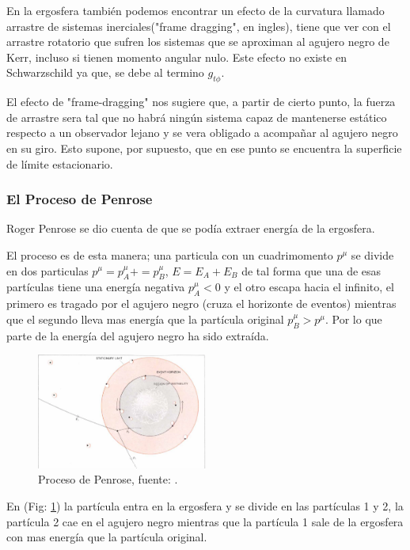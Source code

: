 \documentclass{article}
\begin{document}
En la ergosfera también podemos encontrar un efecto de la curvatura llamado arrastre de sistemas inerciales("frame dragging", en ingles), tiene que ver con el arrastre rotatorio que sufren los sistemas que se aproximan al agujero negro de Kerr, incluso si tienen momento angular nulo. Este efecto no existe en Schwarzschild ya que, se debe al termino $g_{t\phi}$.\cite{jeffersonagujeros}

El efecto de "frame-dragging" nos sugiere que, a partir de cierto punto, la fuerza de arrastre sera tal que no habrá ningún sistema capaz de mantenerse estático respecto a un observador lejano y se vera obligado a acompañar al agujero negro en su giro. Esto supone, por supuesto, que en ese punto se encuentra la superficie de límite estacionario.\cite{jeffersonagujeros}

\subsubsection{El Proceso de Penrose}
Roger Penrose se dio cuenta de que se podía extraer energía de la ergosfera.

El proceso es de esta manera; una particula con un cuadrimomento $p^{\mu}$ se divide en dos particulas $p^{\mu}=p^{\mu}_{A}+=p^{\mu}_{B}$, $E=E_{A}+E_{B}$ de tal forma que una de esas partículas tiene una energía negativa $p^{\mu}_{A} < 0$ y el otro escapa hacia el infinito, el primero es tragado por el agujero negro (cruza el horizonte de eventos) mientras que el segundo lleva mas energía que la partícula original $p^{\mu}_{B} > p^{\mu}$. Por lo que parte de la energía del agujero negro ha sido extraída.\cite{penrose1971extraction}

\begin{figure}[H]
    \centering
    \includegraphics[width=0.5\textwidth]{PenroseProcess.png}
    \caption{Proceso de  Penrose, fuente: \cite{almeida2021thermodynamics}.}
    \label{fig:PenroseProcess}
\end{figure}

En (Fig: \ref{fig:PenroseProcess}) la partícula entra en la ergosfera y se divide en las partículas 1 y 2, la partícula 2 cae en el agujero negro mientras que la partícula 1 sale de la ergosfera con mas energía que la partícula original.
\end{document}
